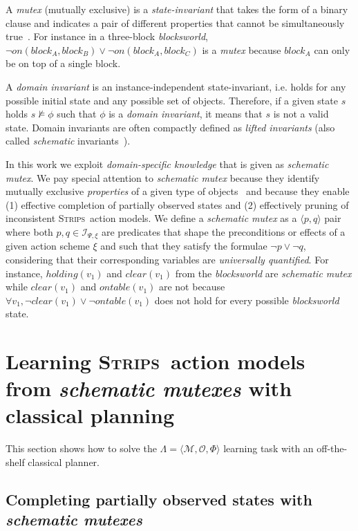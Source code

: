 \documentclass{article}
\newcommand{\tup}[1]{{\langle #1 \rangle}}
\newcommand{\strips}{\textsc{Strips}}
\begin{document}
A {\em mutex} (mutually exclusive) is a {\em state-invariant} that takes the form of a binary clause and indicates a pair of different properties that cannot be simultaneously true~\cite{kautz:mutex:IJCAI1999}. For instance in a three-block {\em blocksworld}, $\neg on(block_A,block_B)\vee \neg on(block_A,block_C)$ is a {\em mutex} because $block_A$ can only be on top of a single block.

A {\em domain invariant} is an instance-independent state-invariant, i.e. holds for any possible initial state and any possible set of objects. Therefore, if a given state $s$ holds $s\nvDash \phi$ such that $\phi$ is a {\em domain invariant}, it means that $s$ is not a valid state. Domain invariants are often compactly defined as {\em lifted invariants} (also called {\em schematic} invariants~\cite{rintanen:schematicInvariants:AAAI2017}).

In this work we exploit {\em domain-specific knowledge} that is given as  {\em schematic mutex}. We pay special attention to {\em schematic mutex} because they identify mutually exclusive {\em properties} of a given type of objects~\cite{fox:TIM:JAIR1998} and because they enable (1) effective completion of partially observed states and (2) effectively pruning of inconsistent \strips\ action models.  We define a {\em schematic mutex} as a $\tup{p,q}$ pair where both $p,q\in{\mathcal I}_{\Psi,\xi}$ are predicates that shape the preconditions or effects of a given action scheme $\xi$ and such that they satisfy the formulae $\neg p\vee \neg q$, considering that their corresponding variables are {\em universally quantified}. For instance, $holding(v_1)$ and $clear(v_1)$ from the {\em blocksworld} are {\em schematic mutex} while $clear(v_1)$ and $ontable(v_1)$ are not because $\forall v_1, \neg clear(v_1)\vee\neg ontable(v_1)$ does not hold for every possible {\em blocksworld} state.



\section{Learning \strips\ action models from {\em schematic mutexes} with classical planning}
\label{sec:compilation}
This section shows how to solve the $\Lambda=\tup{\mathcal{M},{\mathcal O},\Phi}$ learning task with an off-the-shelf classical planner.

\subsection{Completing partially observed states with {\em schematic mutexes}}
\end{document}
